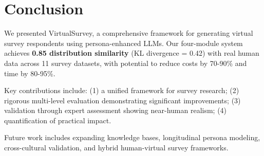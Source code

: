 \documentclass[sigconf,nonarchival]{acmart}
\begin{document}

\section{Conclusion}

We presented VirtualSurvey, a comprehensive framework for generating virtual survey respondents using persona-enhanced LLMs. Our four-module system achieves \textbf{0.85 distribution similarity} (KL divergence = 0.42) with real human data across 11 survey datasets, with potential to reduce costs by 70-90\% and time by 80-95\%.

Key contributions include: (1) a unified framework for survey research; (2) rigorous multi-level evaluation demonstrating significant improvements; (3) validation through expert assessment showing near-human realism; (4) quantification of practical impact.

Future work includes expanding knowledge bases, longitudinal persona modeling, cross-cultural validation, and hybrid human-virtual survey frameworks.




\end{document}
